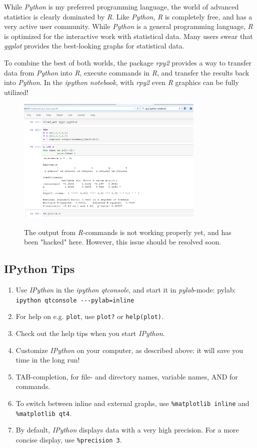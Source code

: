 While \emph{Python} is my preferred programming language, the world of advanced statistics is clearly dominated by \emph{R}. Like \emph{Python}, \emph{R} is completely free, and has a very active user community. While \emph{Python} is a general programming language, \emph{R} is optimized for the interactive work with statistical data. Many users swear that \emph{ggplot} provides the best-looking graphs for statistical data.

To combine the best of both worlds, the package \emph{rpy2} provides a way to transfer data from \emph{Python} into \emph{R}, execute commands in \emph{R}, and transfer the results back into \emph{Python}. In the \emph{ipython notebook}, with \emph{rpy2} even \emph{R} graphics can be fully utilized!

\begin{figure}
  \centering
  \includegraphics[width=0.8\textwidth]{../Images/ipython-rmagic.png}\\
  \caption{The output from \emph{R}-commands is not working properly yet, and has been "hacked" here. However, this issue should be resolved soon.}
\end{figure}

\subsection{IPython Tips}

\begin{enumerate}
    \item Use \emph{IPython} in the \emph{ipython qtconsole}, and start it in \emph{pylab}-mode: pylab: \lstinline{ipython qtconsole ---pylab=inline}
    \item For help on e.g. \lstinline{plot}, use \lstinline{plot?} or \lstinline{help(plot)}.
    \item Check out the help tips when you start \emph{IPython}.
    \item Customize \emph{IPython} on your computer, as described above: it will save you time in the long run!
    \item TAB-completion, for file- and directory names, variable names, AND for commands.
    \item To switch between inline and external graphs, use \; \lstinline{%matplotlib inline} \; and \; \lstinline{%matplotlib qt4}.
    \item By default, \emph{IPython} displays data with a very high precision. For a more concise display, use \lstinline{%precision 3}.
\end{enumerate}

